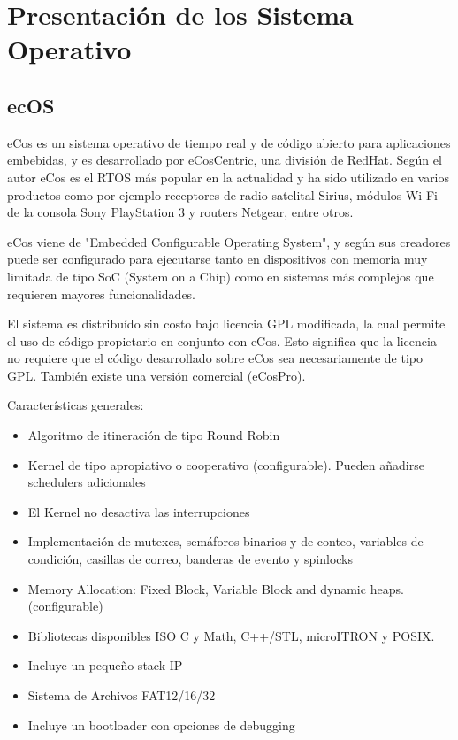  	

		\section{Presentación de los Sistema Operativo}
 		
			 	\subsection{ecOS}

eCos \cite{Etiqueta35} es un sistema operativo de tiempo real y de código abierto para aplicaciones embebidas, y es desarrollado por eCosCentric, una división de RedHat. Según el autor eCos es el RTOS más popular en la actualidad y ha sido utilizado en varios productos como 
por ejemplo receptores de radio satelital Sirius, módulos Wi-Fi de la consola Sony PlayStation 3 
y routers Netgear, entre otros. 


 eCos viene de "Embedded Configurable Operating System", y según sus creadores puede ser configurado para ejecutarse tanto en dispositivos con memoria muy limitada de tipo SoC (System on a Chip) como en sistemas más complejos que requieren mayores funcionalidades. 
 
El sistema es distribuído sin costo bajo licencia GPL modificada, la cual permite el uso de código propietario en conjunto con eCos. Esto significa que la licencia no requiere que el código desarrollado sobre eCos sea necesariamente de tipo GPL. También existe una versión comercial 
(eCosPro).

Características generales: 
				\begin{itemize}
				  	\item Algoritmo de itineración de tipo Round Robin
					\item Kernel de tipo apropiativo o cooperativo (configurable). Pueden añadirse schedulers 
 adicionales
					\item El Kernel no desactiva las interrupciones
					\item Implementación de mutexes, semáforos binarios y de conteo, variables de condición, 
 casillas de correo, banderas de evento y spinlocks
					\item Memory Allocation: Fixed Block, Variable Block and dynamic heaps. (configurable)
					\item Bibliotecas disponibles ISO C y Math, C++/STL, microITRON y POSIX. 
					\item  Incluye un pequeño stack IP
					\item Sistema de Archivos FAT12/16/32
					\item Incluye un bootloader con opciones de debugging
				\end{itemize}			

